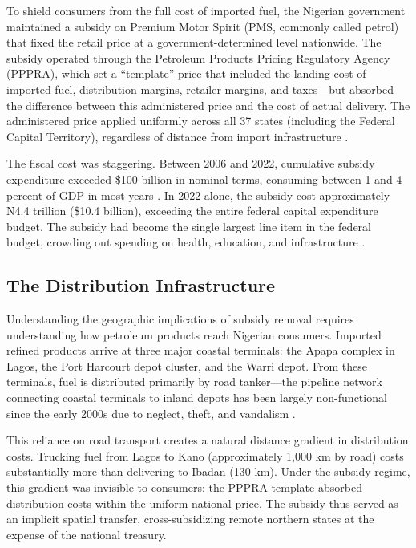 \documentclass[12pt]{article}
\newcommand{\naira}{\textnigerian}
\renewcommand{\naira}{\mbox{\rlap{\hspace{0.09em}=}N}}
\begin{document}
To shield consumers from the full cost of imported fuel, the Nigerian government maintained a subsidy on Premium Motor Spirit (PMS, commonly called petrol) that fixed the retail price at a government-determined level nationwide. The subsidy operated through the Petroleum Products Pricing Regulatory Agency (PPPRA), which set a ``template'' price that included the landing cost of imported fuel, distribution margins, retailer margins, and taxes---but absorbed the difference between this administered price and the cost of actual delivery. The administered price applied uniformly across all 37 states (including the Federal Capital Territory), regardless of distance from import infrastructure \citep{NNPC2022}.

The fiscal cost was staggering. Between 2006 and 2022, cumulative subsidy expenditure exceeded \$100 billion in nominal terms, consuming between 1 and 4 percent of GDP in most years \citep{IMF2019,Bazilian2014}. In 2022 alone, the subsidy cost approximately \naira{}4.4 trillion (\$10.4 billion), exceeding the entire federal capital expenditure budget. The subsidy had become the single largest line item in the federal budget, crowding out spending on health, education, and infrastructure \citep{WorldBank2022}.

\subsection{The Distribution Infrastructure}

Understanding the geographic implications of subsidy removal requires understanding how petroleum products reach Nigerian consumers. Imported refined products arrive at three major coastal terminals: the Apapa complex in Lagos, the Port Harcourt depot cluster, and the Warri depot. From these terminals, fuel is distributed primarily by road tanker---the pipeline network connecting coastal terminals to inland depots has been largely non-functional since the early 2000s due to neglect, theft, and vandalism \citep{NNPC2022}.

This reliance on road transport creates a natural distance gradient in distribution costs. Trucking fuel from Lagos to Kano (approximately 1,000 km by road) costs substantially more than delivering to Ibadan (130 km). Under the subsidy regime, this gradient was invisible to consumers: the PPPRA template absorbed distribution costs within the uniform national price. The subsidy thus served as an implicit spatial transfer, cross-subsidizing remote northern states at the expense of the national treasury.
\end{document}

